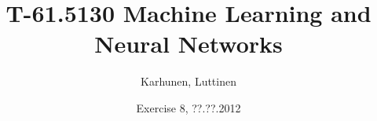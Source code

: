 
\title{T-61.5130 Machine Learning and Neural Networks}
\author{Karhunen, Luttinen}
\date{Exercise 8, ??.??.2012}

\newcommand{\vect}[1]{{\bf{#1}}}
\newcommand{\svect}[1]{\boldsymbol{#1}}
\newcommand{\matr}[1]{\boldsymbol{#1}}

\renewcommand{\vec}[1]{\mathbf{#1}}
\newcommand{\set}[1]{\mathcal{#1}}
\newcommand{\C}{\set{C}}
\newcommand{\E}{\mathcal{E}}
\newcommand{\I}{\vec{I}}
\renewcommand{\L}{\mathcal{L}}
\newcommand{\N}{\mathrm{I \negmedspace N}}
\newcommand{\R}{\mathrm{I \negmedspace R}}
\newcommand{\V}{\set{V}}
\newcommand{\W}{\vec{W}}
\newcommand{\X}{\set{X}}
\newcommand{\e}{\vec{e}}
\newcommand{\h}{\vec{h}}
\newcommand{\m}{\vec{m}}
\newcommand{\mub}{\boldsymbol{\mu}}
\newcommand{\n}{\vec{n}}
\renewcommand{\t}{\vec{t}}
\renewcommand{\u}{\vec{u}}
\renewcommand{\v}{\vec{v}}
\newcommand{\w}{\vec{w}}
\newcommand{\x}{\vec{x}}
\newcommand{\y}{\vec{y}}
\newcommand{\Y}{\vec{Y}}
\newcommand{\z}{\vec{z}}
\newcommand{\argmin}{\operatornamewithlimits{argmin}}
\newcommand{\argmax}{\operatornamewithlimits{argmax}}




\maketitle

